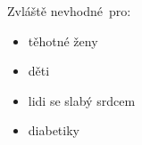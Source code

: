 \documentclass[pdf,blends]{prosper}
\begin{document}
\begin{slide}{Zvláště nevhodné~pro:}

\begin{itemize}
\item těhotné ženy
\item děti
\item lidi se slabý srdcem
\item diabetiky

\end{itemize}

\begin{figure}[h]
\end{figure}

\end{slide}
\end{document}
